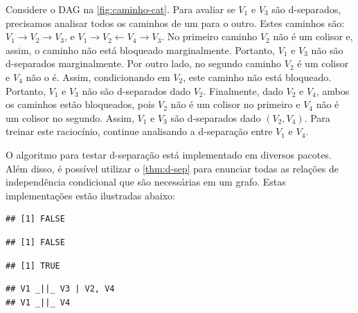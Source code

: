 \begin{example}
 \label{ex:dsep}
 Considere o DAG na \cref{fig:caminho-cat}.
 Para avaliar se $V_1$ e $V_3$ são d-separados,
 precisamos analisar todos os caminhos de um para o outro.
 Estes caminhos são: $V_1 \rightarrow V_2 \rightarrow V_3$, e
 $V_1 \rightarrow V_2 \leftarrow V_4 \rightarrow V_3$.
 No primeiro caminho $V_2$ não é um colisor e, assim,
 o caminho não está bloqueado marginalmente.
 Portanto, $V_1$ e $V_3$ não são d-separados marginalmente.
 Por outro lado, no segundo caminho $V_2$ é um colisor e
 $V_4$ não o é. Assim,
 condicionando em $V_2$, este caminho não está bloqueado.
 Portanto, $V_1$ e $V_3$ não são d-separados dado $V_2$.
 Finalmente, dado $V_2$ e $V_4$, 
 ambos os caminhos estão bloqueados, 
 pois $V_2$ não é um colisor no primeiro e
 $V_4$ não é um colisor no segundo.
 Assim, $V_1$ e $V_3$ são d-separados dado $(V_2,V_4)$.
 Para treinar este raciocínio,
 continue analisando a d-separação entre $V_1$ e $V_4$.
 
 O algoritmo para testar d-separação está
 implementado em diversos pacotes.
 Além disso, é possível utilizar o
 \cref{thm:d-sep} para enunciar 
 todas as relações de independência condicional que
 são necessárias em um grafo.
 Estas implementações estão ilustradas abaixo:
\begin{knitrout}
\color{fgcolor}\begin{kframe}
\begin{alltt}
 \hlkwb{<-} 

 \hlstd{,} \hlstd{,} \hlstd{(}\hlstd{))}
\end{alltt}
\begin{verbatim}
## [1] FALSE
\end{verbatim}
\begin{alltt}
 \hlstd{,} \hlstd{,} \hlstd{(}\hlstd{))}
\end{alltt}
\begin{verbatim}
## [1] FALSE
\end{verbatim}
\begin{alltt}
 \hlstd{,} \hlstd{,} \hlstd{(}\hlstd{,} \hlstd{))}
\end{alltt}
\begin{verbatim}
## [1] TRUE
\end{verbatim}
\begin{alltt}
\end{alltt}
\begin{verbatim}
## V1 _||_ V3 | V2, V4
## V1 _||_ V4
\end{verbatim}
\end{kframe}
\end{knitrout}
\end{example}


